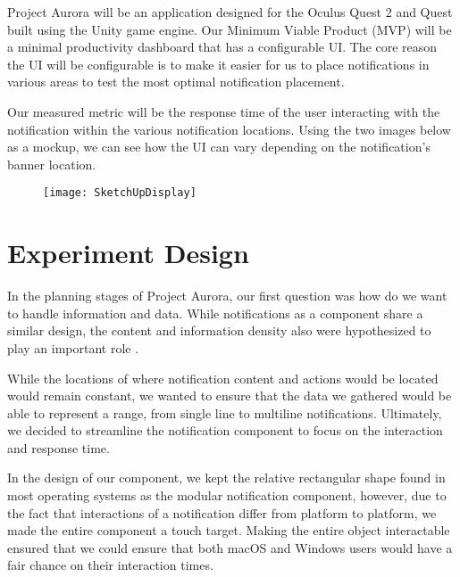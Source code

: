 \documentclass[acmlarge]{acmart}
\begin{document}
Project Aurora will be an application designed for the Oculus Quest 2 and Quest built using the Unity game engine. Our Minimum Viable Product (MVP) will be a minimal productivity dashboard that has a configurable UI. The core reason the UI will be configurable is to make it easier for us to place notifications in various areas to test the most optimal notification placement.

Our measured metric will be the response time of the user interacting with the notification within the various notification locations. Using the two images below as a mockup, we can see how the UI can vary depending on the notification’s banner location.

\begin{figure}[h]
  \centering
  \texttt{[image: SketchUpDisplay]}
\end{figure}

\section{Experiment Design}
In the planning stages of Project Aurora, our first question was how do we want to handle information and data. While notifications as a component share a similar design, the content and information density also were hypothesized to play an important role \citet{Seinfeld22,Woodward20,Rzayev20}.

While the locations of where notification content and actions would be located would remain constant, we wanted to ensure that the data we gathered would be able to represent a range, from single line to multiline notifications. Ultimately, we decided to streamline the notification component to focus on the interaction and response time. 

In the design of our component, we kept the relative rectangular shape found in most operating systems as the modular notification component, however, due to the fact that interactions of a notification differ from platform to platform, we made the entire component a touch target. Making the entire object interactable ensured that we could ensure that both macOS and Windows users would have a fair chance on their interaction times. 
\end{document}
